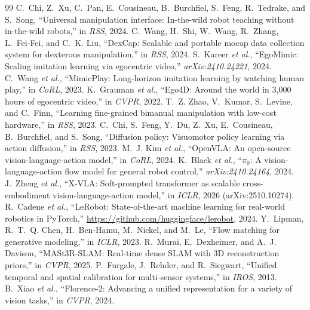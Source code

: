\documentclass[conference,10pt]{IEEEtran}
\begin{document}
\begin{thebibliography}{99}\footnotesize
{} C.~Chi, Z.~Xu, C.~Pan, E.~Cousineau, B.~Burchfiel, S.~Feng, R.~Tedrake, and S.~Song, ``Universal manipulation interface: In-the-wild robot teaching without in-the-wild robots,'' in \emph{RSS}, 2024.
 C.~Wang, H.~Shi, W.~Wang, R.~Zhang, L.~Fei-Fei, and C.~K. Liu, ``DexCap: Scalable and portable mocap data collection system for dexterous manipulation,'' in \emph{RSS}, 2024.
 S.~Kareer \emph{et al.}, ``EgoMimic: Scaling imitation learning via egocentric video,'' \emph{arXiv:2410.24221}, 2024.
 C.~Wang \emph{et al.}, ``MimicPlay: Long-horizon imitation learning by watching human play,'' in \emph{CoRL}, 2023.
 K.~Grauman \emph{et al.}, ``Ego4D: Around the world in 3,000 hours of egocentric video,'' in \emph{CVPR}, 2022.
 T.~Z. Zhao, V.~Kumar, S.~Levine, and C.~Finn, ``Learning fine-grained bimanual manipulation with low-cost hardware,'' in \emph{RSS}, 2023.
 C.~Chi, S.~Feng, Y.~Du, Z.~Xu, E.~Cousineau, B.~Burchfiel, and S.~Song, ``Diffusion policy: Visuomotor policy learning via action diffusion,'' in \emph{RSS}, 2023.
 M.~J. Kim \emph{et al.}, ``OpenVLA: An open-source vision-language-action model,'' in \emph{CoRL}, 2024.
 K.~Black \emph{et al.}, ``$\pi_0$: A vision-language-action flow model for general robot control,'' \emph{arXiv:2410.24164}, 2024.
 J.~Zheng \emph{et al.}, ``X-VLA: Soft-prompted transformer as scalable cross-embodiment vision-language-action model,'' in \emph{ICLR}, 2026 (arXiv:2510.10274).
 R.~Cadene \emph{et al.}, ``LeRobot: State-of-the-art machine learning for real-world robotics in PyTorch,'' \url{https://github.com/huggingface/lerobot}, 2024.
 Y.~Lipman, R.~T.~Q. Chen, H.~Ben-Hamu, M.~Nickel, and M.~Le, ``Flow matching for generative modeling,'' in \emph{ICLR}, 2023.
 R.~Murai, E.~Dexheimer, and A.~J. Davison, ``MASt3R-SLAM: Real-time dense SLAM with 3D reconstruction priors,'' in \emph{CVPR}, 2025.
 P.~Furgale, J.~Rehder, and R.~Siegwart, ``Unified temporal and spatial calibration for multi-sensor systems,'' in \emph{IROS}, 2013.
 B.~Xiao \emph{et al.}, ``Florence-2: Advancing a unified representation for a variety of vision tasks,'' in \emph{CVPR}, 2024.
\end{thebibliography}
\end{document}
